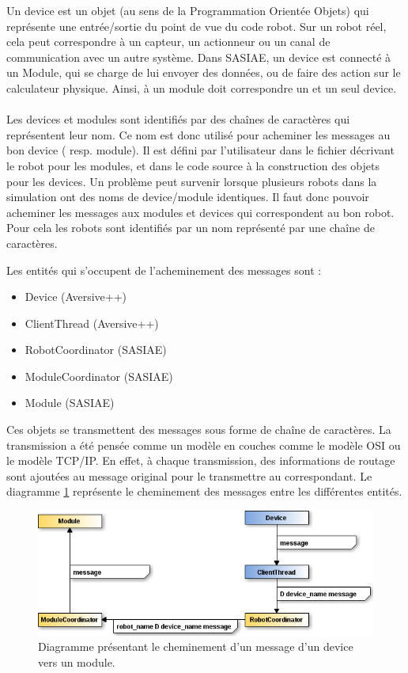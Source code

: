 Un device est un objet (au sens de la Programmation Orientée Objets) qui représente une entrée/sortie du point de vue du code robot. Sur un robot réel, cela peut correspondre à un capteur, un actionneur ou un canal de communication avec un autre système. Dans SASIAE, un device est connecté à un Module, qui se charge de lui envoyer des données, ou de faire des action sur le calculateur physique.
Ainsi, à un module doit correspondre un et un seul device.

\paragraph{}
Les devices et modules sont identifiés par des chaînes de caractères qui représentent leur nom. Ce nom est donc utilisé pour acheminer les messages au bon device ( resp. module). Il est défini par l'utilisateur dans le fichier décrivant le robot pour les modules, et dans le code source à la construction des objets pour les devices.
Un problème peut survenir lorsque plusieurs robots dans la simulation ont des noms de device/module identiques. Il faut donc pouvoir acheminer les messages aux modules et devices qui correspondent au bon robot. Pour cela les robots sont identifiés par un nom représenté par une chaîne de caractères.

Les entités qui s'occupent de l'acheminement des messages sont :
\begin{itemize}
\item Device (Aversive++)
\item ClientThread (Aversive++)
\item RobotCoordinator (SASIAE)
\item ModuleCoordinator (SASIAE)
\item Module (SASIAE)
\end{itemize}
Ces objets se transmettent des messages sous forme de chaîne de caractères. La transmission a été pensée comme un modèle en couches comme le modèle OSI ou le modèle TCP/IP. En effet, à chaque transmission, des informations de routage sont ajoutées au message original pour le transmettre au correspondant.
Le diagramme \ref{commoduledevice} représente le cheminement des messages entre les différentes entités.

\begin{figure}[!h]
\includegraphics[scale=0.5]{DiagComModuleDevice}
\caption{Diagramme présentant le cheminement d'un message d'un device vers un module.}
\label{commoduledevice}
\end{figure}
\clearpage

